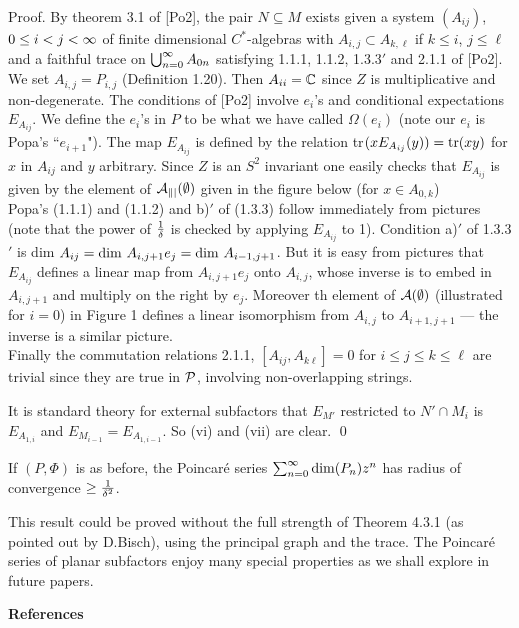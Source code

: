 \bigskip
{\sc Proof.} By theorem 3.1 of [Po2], the pair $N\subseteq M$
exists given a system $(A_{ij})$, $0 \leq i < j < \i$ of finite
dimensional $C^*$-algebras with $A_{i,j}\subset A_{k,\ell}$ if
$k\leq i$, $j\leq\ell$ and a faithful trace on $\bigcup^\i_{n=0}
A_{0n}$ satisfying 1.1.1, 1.1.2, 1.3.3$'$ and 2.1.1 of
[Po2]. We set $A_{i,j}=P_{i,j}$ (Definition 1.20). Then
$A_{ii}=\Bbb C$ since $Z$ is multiplicative and non-degenerate. The
conditions of %
[Po2]  involve $e_i$'s and conditional
expectations
$E_{A_{ij}}$. We define the $e_i$'s in $P$ to be what we have called
$\Omega(e_i)$ (note our $e_i$ is
Popa's ``$e_{i+1}$"). The map $E_{A_{ij}}$ is defined by the
relation tr$(xE_{A_{ij}}(y))={\op{tr}}(xy)$ for $x$ in $A_{ij}$ and
$y$ arbitrary. Since $Z$ is an $S^2$ invariant one easily checks
that $E_{A_{ij}}$ is given by the element of $\cal A_{kj}(\emptyset)$ 
given in the figure below (for $x\in A_{0,k}$) 
\[
	
\]
\ni Popa's  (1.1.1) and (1.1.2) and b)$'$ of (1.3.3) follow
immediately from pictures (note that the power of $\frac 1\d$ is
checked by applying $E_{A_{ij}}$ to 1). Condition a)$'$ of 1.3.3$'$
is dim $A_{ij}=
{\op{dim}} \ A_{i,j+1}e_j={\op{dim}} \ A_{i-1,j+1}$. But it is easy
from pictures that $E_{A_{ij}}$ defines a linear map from
$A_{i,j+1}e_j$ onto $A_{i,j}$, whose inverse is to embed in
$A_{i,j+1}$ and multiply on the right by $e_j$. Moreover th element
of $\cal A(\emptyset)$ (illustrated for $i\!=\!0$) in Figure 1
defines a linear isomorphism from $A_{i,j}$ to $A_{i+1,j+1}$ ---
the inverse is a similar picture.
\[
	
\]
\ni Finally  the commutation relations 2.1.1,
$[A_{ij},A_{k\ell}]=0$ for $i\leq j\leq k \leq\ell$ are trivial
since they are true in $\P$, involving non-overlapping strings.

It is standard theory for external subfactors that $E_{M'}$
restricted to $N'\cap M_i$ is $E_{A_{1,i}}$ and
$E_{M_{i-1}}=E_{A_{1,i-1}}$. So (vi) and (vii) are clear. \qed

\bigskip
{} If $(P,\Phi)$ is as before, the
Poincar\'e series $\sum^\i_{n=0}\dim (P_n)z^n$ has radius of
convergence $\geq\frac{1}{\d^2}$.

\bigskip
This result could be proved without the full strength of Theorem
4.3.1 (as pointed out by D.Bisch), using the principal graph and
the trace. The Poincar\'e series of planar subfactors enjoy many
special properties as we shall explore in future papers.

\newpage
\centerline{\bf References}

